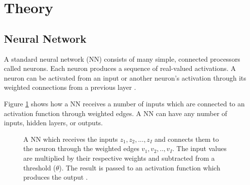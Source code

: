 \section{Theory}

\subsection{Neural Network}

A standard neural network (NN) consists of many simple, connected processors called neurons. Each neuron produces a sequence of real-valued activations. A neuron can be activated from an input or another neuron's activation through its weighted connections from a previous layer \cite{NeuralNetwork}.

Figure \ref{fig:neural-network} shows how a NN receives a number of inputs which are connected to an activation function through weighted edges. A NN can have any number of inputs, hidden layers, or outputs.

\begin{figure} \label{fig:neural-network}
\centering
{}
\caption{A NN which receives the inputs $z_1, z_2, ..., z_I$ and connects them to the neuron through the weighted edges $v_1, v_2, .., v_I$. The input values are multiplied by their respective weights and subtracted from a threshold ($\theta$). The result is passed to an activation function which produces the output \cite{Engelbrecht}.}
\end{figure}

